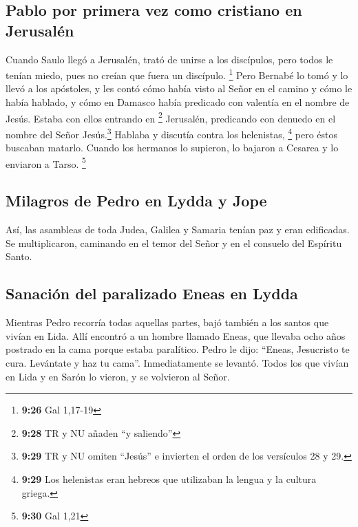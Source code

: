 \begin{paracol}{2}
\hypertarget{pablo-por-primera-vez-como-cristiano-en-jerusaluxe9n}{%
\subsection{Pablo por primera vez como cristiano en
Jerusalén}\label{pablo-por-primera-vez-como-cristiano-en-jerusaluxe9n}}

 Cuando Saulo llegó a Jerusalén, trató de unirse a los
discípulos, pero todos le tenían miedo, pues no creían que fuera un
discípulo. \footnote{\textbf{9:26} Gal 1,17-19}  Pero
Bernabé lo tomó y lo llevó a los apóstoles, y les contó cómo había visto
al Señor en el camino y cómo le había hablado, y cómo en Damasco había
predicado con valentía en el nombre de Jesús.  Estaba con
ellos entrando en \footnote{\textbf{9:28} TR y NU añaden ``y saliendo''}
Jerusalén,  predicando con denuedo en el nombre del Señor
Jesús.\footnote{\textbf{9:29} TR y NU omiten ``Jesús'' e invierten el
  orden de los versículos 28 y 29.} Hablaba y discutía contra los
helenistas, \footnote{\textbf{9:29} Los helenistas eran hebreos que
  utilizaban la lengua y la cultura griega.} pero éstos buscaban
matarlo.  Cuando los hermanos lo supieron, lo bajaron a
Cesarea y lo enviaron a Tarso. \footnote{\textbf{9:30} Gal 1,21}

\hypertarget{milagros-de-pedro-en-lydda-y-jope}{%
\subsection{Milagros de Pedro en Lydda y
Jope}\label{milagros-de-pedro-en-lydda-y-jope}}

 Así, las asambleas de toda Judea, Galilea y Samaria
tenían paz y eran edificadas. Se multiplicaron, caminando en el temor
del Señor y en el consuelo del Espíritu Santo.

\hypertarget{sanaciuxf3n-del-paralizado-eneas-en-lydda}{%
\subsection{Sanación del paralizado Eneas en
Lydda}\label{sanaciuxf3n-del-paralizado-eneas-en-lydda}}

 Mientras Pedro recorría todas aquellas partes, bajó
también a los santos que vivían en Lida.  Allí encontró a
un hombre llamado Eneas, que llevaba ocho años postrado en la cama
porque estaba paralítico.  Pedro le dijo: ``Eneas,
Jesucristo te cura. Levántate y haz tu cama''. Inmediatamente se
levantó.  Todos los que vivían en Lida y en Sarón lo
vieron, y se volvieron al Señor.


\end{paracol}
